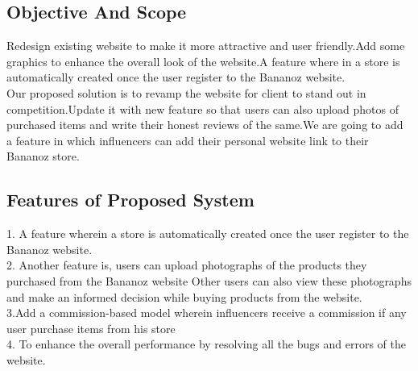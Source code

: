 \subsection{Objective And Scope}
Redesign existing website to make it more attractive and user friendly.Add some graphics to enhance the overall look of the website.A feature where in a store is automatically created once the user register to the Bananoz website.
\\
Our proposed solution is to revamp the website for client to stand out in competition.Update it with new feature so that users can also upload photos of purchased items and write their honest reviews of the same.We are going to add a feature in which influencers can add their personal website link to their Bananoz store.
\\


\subsection{Features of Proposed System}
1. A feature wherein a store is automatically created once the user register to the Bananoz website.\\
2. Another feature  is, users can upload photographs of the products they purchased from the Bananoz website Other users can also view these photographs and make an informed decision while buying products from the website.\\
3.Add a commission-based model wherein influencers receive a commission if any user purchase items from his store\\
4. To enhance the overall performance by resolving all the bugs and errors of the website.\\

